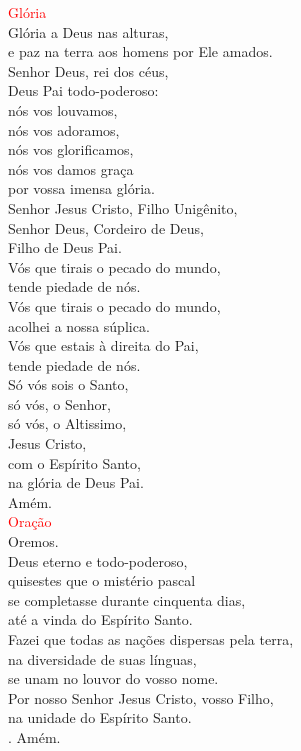 \documentclass{book}
\begin{document}
\begin{flushleft}
    \newpage

    \textcolor{red}{Glória}
    \vspace{0.2cm} \\
    Glória a Deus nas alturas, \\
    e paz na terra aos homens por Ele amados. \\
    Senhor Deus, rei dos céus, \\
    Deus Pai todo-poderoso: \\
    nós vos louvamos, \\
    nós vos adoramos, \\
    nós vos glorificamos, \\
    nós vos damos graça \\
    por vossa imensa glória. \\
    Senhor Jesus Cristo, Filho Unigênito, \\
    Senhor Deus, Cordeiro de Deus, \\
    Filho de Deus Pai. \\
    Vós que tirais o pecado do mundo, \\
    tende piedade de nós. \\
    Vós que tirais o pecado do mundo, \\
    acolhei a nossa súplica. \\
    Vós que estais à direita do Pai, \\
    tende piedade de nós. \\
    Só vós sois o Santo, \\
    só vós, o Senhor, \\
    só vós, o Altissimo, \\
    Jesus Cristo, \\
    com o Espírito Santo, \\
    na glória de Deus Pai. \\
    Amém.
    \vspace{0.2cm} \\
    \textcolor{red}{Oração}
    \vspace{0.1cm} \\
    Oremos.
    \vspace{0.1cm}\\
    Deus eterno e todo-poderoso, \\
    quisestes que o mistério pascal \\
    se completasse durante cinquenta dias, \\
    até a vinda do Espírito Santo. \\
    Fazei que todas as nações dispersas pela terra, \\
    na diversidade de suas línguas, \\
    se unam no louvor do vosso nome. \\
    Por nosso Senhor Jesus Cristo, vosso Filho, \\
    na unidade do Espírito Santo.\\
    {\color{red} \Rbar.} Amém.

\end{flushleft}
\end{document}
